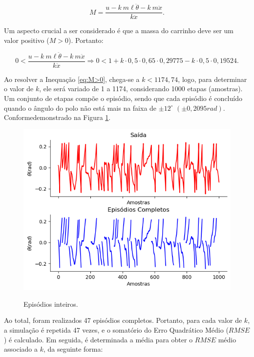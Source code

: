 \documentclass[12pt,           %
a4paper,                       %
openany,                       %
oneside,                       %
chapter=TITLE,                 %
english,                       %
spanish,                       %
brazil,                        %
sumario=tradicional]{abntex2}  %
\begin{document}
\begin{OnehalfSpace}
\begin{equation}
    M = \frac{u - k\:m\ell\ddot{\theta}-k\:m\ddot{x}}{k\ddot{x}}.
    \label{eq:Ma}
\end{equation}

Um aspecto crucial a ser considerado é que a massa do carrinho deve ser um valor positivo ($M > 0$). Portanto:

\begin{equation}
    0 < \frac{u - k\:m\ell\ddot{\theta}-k\:m\ddot{x}}{k\ddot{x}} \Rightarrow 0 < 1 + k\cdot 0,5\cdot 0,65\cdot 0,29775-k\cdot 0,5\cdot 0,19524.
    \label{eq:M>0}
\end{equation}

Ao resolver a Inequação \ref{eq:M>0}, chega-se a $k<1174,74$, logo, para determinar o valor de \( k \), ele será variado de 1 a 1174, considerando 1000 etapas (amostras). Um conjunto de etapas compõe o episódio, sendo que cada episódio é concluído quando o ângulo do polo não está mais na faixa de \( \pm 12^\circ \) $(\pm 0,2095rad)$. Conformedemonstrado na Figura \ref{fig:ep}.

\begin{figure}[H]
     \centering
     \vspace*{-.25cm}
     \caption{Episódios inteiros.}
     \includegraphics[scale=.53]{episodio.png}
     \label{fig:ep}
\end{figure}
\vspace*{-.8cm}
{\raggedright {}}

Ao total, foram realizados 47 episódios completos. Portanto, para cada valor de \(k\), a simulação é repetida 47 vezes, e o somatório do Erro Quadrático Médio (\(RMSE\))\cite{aguirre2004} é calculado. Em seguida, é determinada a média para obter o \(RMSE\) médio associado a \(k\), da seguinte forma:


\end{OnehalfSpace}
\end{document}
